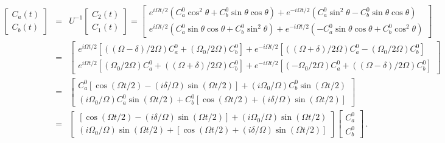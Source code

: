 \documentclass[twocolumn,aps,eqsecnum]{revtex4}
\begin{document}
\begin{widetext}
%
\begin{eqnarray*}
\left[ \begin{array}{c} C_a(t) \\ C_b(t) \end{array} \right]    
&=& U^{-1} 
\left[ \begin{array}{c} C_2(t) \\ C_1(t) \end{array} \right]  
%
  = \left[ \begin{array}{c} e^{i\Omega t/2}
    ( C_a^0\cos^2{\theta} + C_b^0 \sin{\theta} \cos{\theta} ) 
    + e^{-i\Omega t/2}
    (C_a^0\sin^2{\theta} - C_b^0 \sin{\theta} \cos{\theta} ) \\ 
e^{i\Omega t/2}
    ( C_a^0 \sin{\theta} \cos{\theta} + C_b^0 \sin^2{\theta} ) 
    + e^{-i\Omega t/2}
    (-C_a^0 \sin{\theta} \cos{\theta} + C_b^0 \cos^2{\theta} )
    \end{array} \right]     \\ 
%
&=& \left[ \begin{array}{c} e^{i\Omega t/2}
 [ ((\Omega -\delta)/2\Omega) C_a^0 + (\Omega_0/2\Omega) C_b^0  ] 
 + e^{-i\Omega t/2} 
 [ ((\Omega +\delta)/2\Omega) C_a^0 - (\Omega_0/2\Omega) C_b^0  ] \\ 
e^{i\Omega t/2} 
    [ (\Omega_0/2\Omega) C_a^0 + ((\Omega +\delta)/2\Omega) C_b^0 ] 
    + e^{-i\Omega t/2}
    [ (-\Omega_0/2\Omega) C_a^0 + ((\Omega -\delta)/2\Omega) C_b^0 ]
    \end{array} \right]      \\
%
&=& \left[ \begin{array}{c} 
C_a^0 [ \cos{(\Omega t/2)} -(i\delta /\Omega) \sin{(\Omega t/2)} ] 
    + (i\Omega_0 /\Omega) C_b^0 \sin{(\Omega t/2)}     \\ 
    (i\Omega_0 /\Omega) C_a^0 \sin{(\Omega t/2)} 
    +C_b^0 
    [ \cos{(\Omega t/2)} +(i\delta /\Omega) \sin{(\Omega t/2)} ]
 \end{array} \right]         \\ 
%
&=& \left[ \begin{array}{c} 
 [ \cos{(\Omega t/2)} -(i\delta /\Omega) \sin{(\Omega t/2)} ] 
    + (i\Omega_0 /\Omega)  \sin{(\Omega t/2)}     \\ 
    (i\Omega_0 /\Omega) \sin{(\Omega t/2)} 
    +[ \cos{(\Omega t/2)} +(i\delta /\Omega) \sin{(\Omega t/2)} ]
 \end{array} \right]  
 \left[ \begin{array}{c} C_a^0 \\ C_b^0 \end{array} \right] \,.
\end{eqnarray*}

\end{widetext} 
\end{document}
